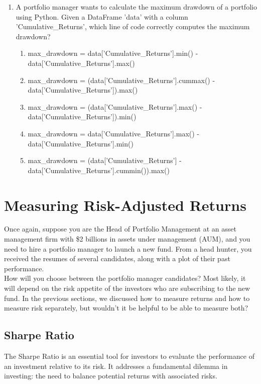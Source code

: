 \documentclass{article}
\begin{document}
\begin{enumerate}
    \item A portfolio manager wants to calculate the maximum drawdown of a portfolio using Python. Given a DataFrame 'data' with a column 'Cumulative\_Returns', which line of code correctly computes the maximum drawdown?
        \begin{enumerate}
            \item max\_drawdown = data['Cumulative\_Returns'].min() - data['Cumulative\_Returns'].max()
            \item max\_drawdown = (data['Cumulative\_Returns'].cummax() - data['Cumulative\_Returns']).max()
            \item max\_drawdown = (data['Cumulative\_Returns'].max() - data['Cumulative\_Returns']).min()
            \item max\_drawdown = data['Cumulative\_Returns'].max() - data['Cumulative\_Returns'].min()
            \item max\_drawdown = (data['Cumulative\_Returns'] - data['Cumulative\_Returns'].cummin()).max()
        \end{enumerate}

\end{enumerate}

\clearpage

\section{Measuring Risk-Adjusted Returns}

Once again, suppose you are the Head of Portfolio Management at an asset management firm with \$2 billions in assets under management (AUM), and you need to hire a portfolio manager to launch a new fund. From a head hunter, you received the resumes of several candidates, along with a plot of their past performance. \\

How will you choose between the portfolio manager candidates? Most likely, it will depend on the risk appetite of the investors who are subscribing to the new fund. In the previous sections, we discussed how to measure returns and how to measure risk separately, but wouldn't it be helpful to be able to measure both?

\subsection{Sharpe Ratio}

The Sharpe Ratio is an essential tool for investors to evaluate the performance of an investment relative to its risk. It addresses a fundamental dilemma in investing: the need to balance potential returns with associated risks. \\
\end{document}
